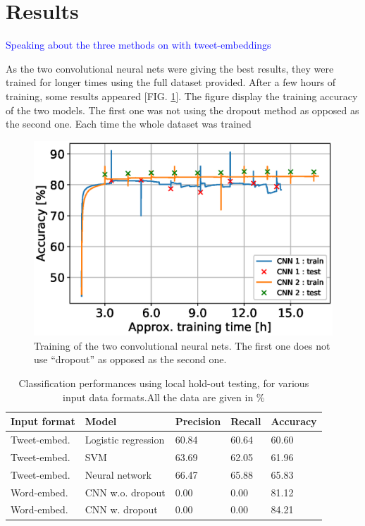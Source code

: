 \section{Results}
\textcolor{blue}{Speaking about the three methods on with tweet-embeddings}

As the two convolutional neural nets were giving the best results, they were trained for longer times using the full dataset provided. After a few hours of training, some results appeared [FIG. \ref{plot:CNNaccuracy}]. The figure display the training accuracy of the two models. The first one was not using the dropout method as opposed as the second one. Each time the whole dataset was trained  



\label{sec:results}
\begin{figure}[h!]
\centering
	\includegraphics[scale=0.6]{CNNaccuracy} 
\caption{Training of the two convolutional neural nets. The first one does not use ``dropout'' as opposed as the second one.}
\label{plot:CNNaccuracy}
\end{figure}
\FloatBarrier


\begin{table}[h]
  \centering
  \begin{tabular}[c]{lllll}
    Input format&Model&Precision&Recall&Accuracy\\
    \hline
    Tweet-embed.&Logistic regression &    60.84   & 60.64 & 60.60 \\
    Tweet-embed.&SVM                 &   63.69     & 62.05  & 61.96 \\
    Tweet-embed.&Neural network	& 66.47	& 65.88	& 65.83 \\
    Word-embed.&CNN w.o. dropout   & 0.00	& 0.00	&  81.12 \\
    Word-embed.&CNN w. dropout & 0.00 & 0.00 & 84.21
    
  \end{tabular}
  \caption{Classification performances using local hold-out testing, for various input data formats.All the data are given in \%}
  \label{tab:results}
\end{table}


